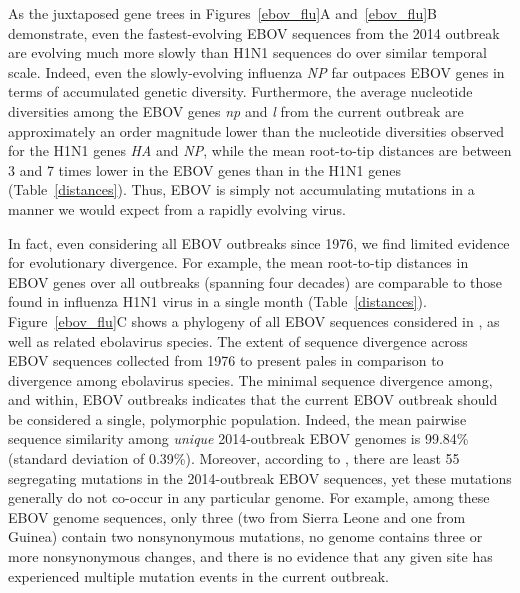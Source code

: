 \documentclass[11pt]{article}
\begin{document}
As the juxtaposed gene trees in Figures~\ref{ebov_flu}A and~\ref{ebov_flu}B  demonstrate, even the fastest-evolving EBOV sequences from the 2014 outbreak are evolving much more slowly than H1N1 sequences do over similar temporal scale. Indeed, even the slowly-evolving influenza \emph{NP} far outpaces EBOV genes in terms of accumulated genetic diversity. Furthermore, the average nucleotide diversities among the EBOV genes \emph{np} and \emph{l} from the current outbreak are approximately an order magnitude lower than the nucleotide diversities observed for the H1N1 genes \emph{HA} and \emph{NP}, while the mean root-to-tip distances are between 3 and 7 times lower in the EBOV genes than in the H1N1 genes (Table~\ref{distances}). Thus, EBOV is simply not accumulating mutations in a manner we would expect from a rapidly evolving virus.

In fact, even considering all EBOV outbreaks since 1976, we find limited evidence for evolutionary divergence. For example, the mean root-to-tip distances in EBOV genes over all outbreaks (spanning four decades) are comparable to those found in influenza H1N1 virus in a single month (Table~\ref{distances}). Figure~\ref{ebov_flu}C shows a phylogeny of all EBOV sequences considered in \citet{Gire2014}, as well as related ebolavirus species. The extent of sequence divergence across EBOV sequences collected from 1976 to present pales in comparison to divergence among ebolavirus species. The minimal sequence divergence among, and within, EBOV outbreaks indicates that the current EBOV outbreak should be considered a single, polymorphic population. Indeed, the mean pairwise sequence similarity among \emph{unique} 2014-outbreak EBOV genomes is 99.84\% (standard deviation of 0.39\%). Moreover, according to \citet{Gire2014}, there are least 55 segregating mutations in the 2014-outbreak EBOV sequences, yet these mutations generally do not co-occur in any particular genome. For example, among these EBOV genome sequences, only three (two from Sierra Leone and one from Guinea) contain two nonsynonymous mutations, no genome contains three or more nonsynonymous changes, and there is no evidence that any given site has experienced multiple mutation events in the current outbreak.  
\end{document}
